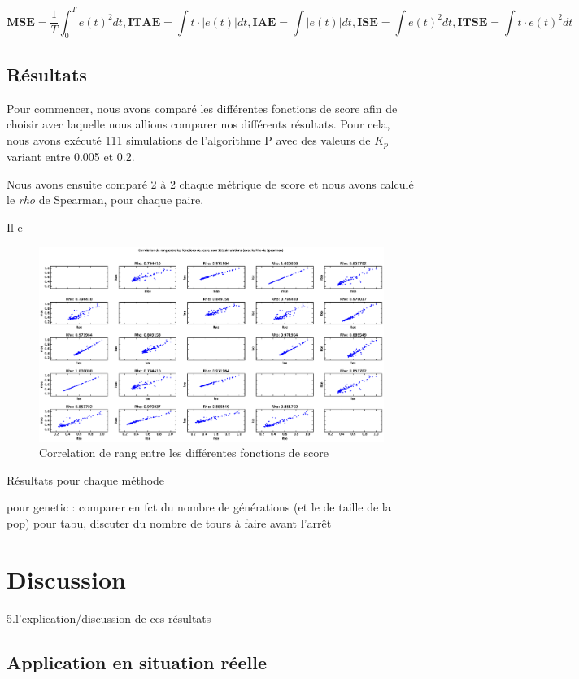 \documentclass[a4paper,10pt]{report}
\begin{document}
$$
\textbf{MSE} = \frac{1}{T} \int_0^T e(t)^2 dt,
\textbf{ITAE} = \int t \cdot |e(t)| dt,
\textbf{IAE} = \int |e(t)| dt,
\textbf{ISE} = \int e(t)^2 dt,
\textbf{ITSE} = \int t \cdot e(t)^2 dt
$$


\section{Résultats}

Pour commencer, nous avons comparé les différentes fonctions de score afin de choisir avec laquelle nous allions comparer nos différents résultats. Pour cela, nous avons exécuté 111 simulations de l'algorithme P avec des valeurs de $K_p$ variant entre 0.005 et 0.2.

Nous avons ensuite comparé 2 à 2 chaque métrique de score et nous avons calculé le \textit{rho} de Spearman, pour chaque paire.

Il e

\begin{figure}[hb!]
   \centering
   \includegraphics[scale=0.35]{correlation.eps}
   \caption{\label{fig:correlation} Correlation de rang entre les différentes fonctions de score}
\end{figure}

Résultats pour chaque méthode

pour genetic : comparer en fct du nombre de générations (et le de taille de la pop)
pour tabu, discuter du nombre de tours à faire avant l'arrêt

\chapter{Discussion}
5.l’explication/discussion de ces résultats

\section{Application en situation réelle}
\end{document}
